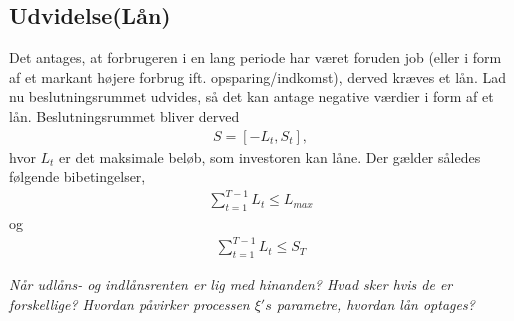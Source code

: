 \subsection{Udvidelse(Lån)}
Det antages, at forbrugeren i en lang periode har været foruden job (eller i form af et markant højere forbrug ift. opsparing/indkomst), derved kræves et lån.
Lad nu beslutningsrummet udvides, så det kan antage negative værdier i form af et lån.
Beslutningsrummet bliver derved
\begin{align*}
    S = [-L_t, S_t],
\end{align*}
hvor $L_t$ er det maksimale beløb, som investoren kan låne. Der gælder således følgende bibetingelser,
\begin{align*}
    \sum_{t=1}^{T-1} L_t \leq L_{max}
\end{align*}
og
\begin{align*}
    \sum_{t=1}^{T-1} L_t \leq S_T
\end{align*}

\textit{Når udlåns- og indlånsrenten er lig med hinanden? Hvad sker hvis de er forskellige? Hvordan påvirker processen $\xi's$ parametre, hvordan lån optages?}